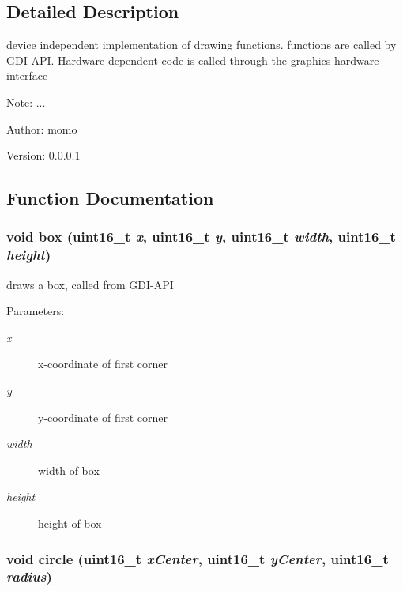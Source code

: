 \subsection{Detailed Description}
device independent implementation of drawing functions. functions are called by GDI API. Hardware dependent code is called through the graphics hardware interface 

\begin{Desc}
\item[Note:]... \end{Desc}
\begin{Desc}
\item[Author:]momo \end{Desc}
\begin{Desc}
\item[Version:]0.0.0.1 \end{Desc}


\subsection{Function Documentation}
\hypertarget{group__graphic__device_g8bdd86d104cca372768afe13dd8e66b4}{
\subsubsection[{box}]{\setlength{\rightskip}{0pt plus 5cm}void box (uint16\_\-t {\em x}, \/  uint16\_\-t {\em y}, \/  uint16\_\-t {\em width}, \/  uint16\_\-t {\em height})}}
\label{group__graphic__device_g8bdd86d104cca372768afe13dd8e66b4}


draws a box, called from GDI-API 

\begin{Desc}
\item[Parameters:]
\begin{description}
\item[{\em x}]x-coordinate of first corner \item[{\em y}]y-coordinate of first corner \item[{\em width}]width of box \item[{\em height}]height of box \end{description}
\end{Desc}
\hypertarget{group__graphic__device_gc94c3233de7ff3e87551f5ee9717b1bb}{
\subsubsection[{circle}]{\setlength{\rightskip}{0pt plus 5cm}void circle (uint16\_\-t {\em xCenter}, \/  uint16\_\-t {\em yCenter}, \/  uint16\_\-t {\em radius})}}
\label{group__graphic__device_gc94c3233de7ff3e87551f5ee9717b1bb}


